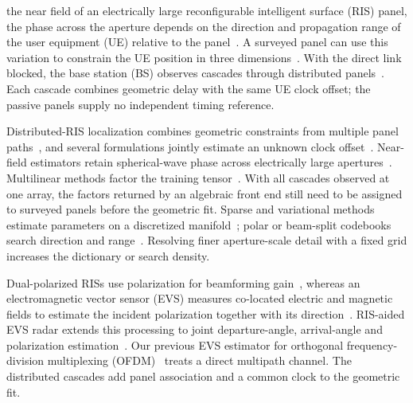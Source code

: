 \documentclass[letterpaper,journal]{IEEEtran}
\begin{document}
 the near field of an electrically large reconfigurable
intelligent surface (RIS) panel, the phase across the aperture depends on
the direction and propagation range of the user equipment (UE) relative to
the panel~\cite{wymeersch2020risloc,cui2023nearfield}. A surveyed panel can use
this variation to constrain the UE position in three
dimensions~\cite{elzanaty2021bounds,zhu2026mixed}. With the direct link
blocked, the base station (BS) observes cascades through
distributed panels~\cite{xia2026nlos}. Each cascade combines geometric delay
with the same UE clock offset; the passive panels supply no independent
timing reference.

Distributed-RIS localization combines geometric constraints from multiple
panel paths~\cite{ma2023distributed,liu2025multiris,zhu2025hybrid}, and several
formulations jointly estimate an unknown clock
offset~\cite{fascista2022rissync,gong2024async,peng2025sdp,yan2025ris,fadakar2024multiris}.
Near-field estimators retain spherical-wave phase across electrically large
apertures~\cite{liu2025corr}. Multilinear methods factor the training
tensor~\cite{lin2021tensor,cao2025tensorris}. With all cascades observed at
one array, the factors returned by an algebraic front end still need to be
assigned to surveyed panels before the geometric fit. Sparse and
variational methods estimate parameters on a discretized
manifold~\cite{li2024vbi}; polar or beam-split codebooks search direction and
range~\cite{cui2022channel,yang2024nfris,zheng2025wideband}. Resolving finer
aperture-scale detail with a fixed grid increases the dictionary or search
density.

Dual-polarized RISs use polarization for beamforming
gain~\cite{han2022dual,zheng2025dualpol}, whereas an electromagnetic vector
sensor (EVS) measures co-located electric and magnetic fields to estimate the
incident polarization together with its
direction~\cite{nehorai1994vector,khan2020sixcomponent,lan2026vecpol}.
RIS-aided EVS radar extends this processing to joint departure-angle,
arrival-angle and polarization estimation~\cite{yu2026emvsris}. Our previous
EVS estimator for orthogonal frequency-division multiplexing
(OFDM)~\cite{gong2026aimdf} treats a direct multipath channel. The distributed
cascades add panel association and a common clock to the geometric fit.
\end{document}
